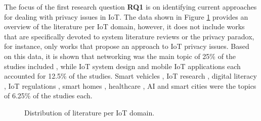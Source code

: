 The focus of the first research question \textbf{RQ1} is on identifying current
approaches for dealing with privacy issues in IoT.
The data shown in Figure \ref{fig:literature_domain} provides an overview
of the literature per IoT domain, however, it does not include works that are
specifically devoted to system literature reviews or the privacy paradox, for
instance, only works that propose an approach to IoT privacy issues.
Based on this data, it is shown that networking was the main topic of
25\% of the studies included \cite{SunSecure, AliIoT, electronics12122589, KumarLTE},
while IoT system design \cite{opara2022framework, perera2020designing} and
mobile IoT applications \cite{FengDesign, DasPersonalized} each accounted
for 12.5\% of the studies. Smart vehicles \cite{zhao2020local}, IoT
research \cite{koohang2022internet}, digital literacy \cite{SkirpanPrivacy},
IoT regulations \cite{hadzovic2023path}, smart homes \cite{xiong2018defending},
healthcare \cite{AntunesFederated}, AI \cite{zhang2017privacy} and
smart cities \cite{ZhuIntegrating} were the topics of 6.25\% of the studies
each.

\begin{figure}
    \centering
    \caption{Distribution of literature per IoT domain.}
    \label{fig:literature_domain}
\end{figure}

